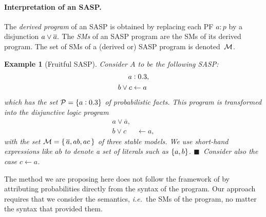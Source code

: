 \documentclass{tlp}
\renewcommand{\cite}{\citep}
\newtheorem{example}{Example}
\newcommand{\cla}[1]{\ensuremath{{\cal #1}}}        %
\newcommand{\clause}{\ensuremath{\leftarrow}}
\newcommand{\co}[1]{\ensuremath{\overline{#1}}}     %
\newcommand{\MODELset}{\ensuremath{\cla{M}}}
\newcommand{\probfact}[2]{\ensuremath{#1:#2}}
\newcommand{\LOOK}{\ensuremath{\blacksquare}}
\newcommand{\franc}[1]{{\color{green!30!black}#1}}
\begin{document}
\paragraph{Interpretation of an SASP.}

The \emph{derived program} of an \ac{SASP} is obtained by replacing
each \acl{PF} \(\probfact{a}{p}\) by a disjunction
   \( a \disj \co{a}. \)
The \textit{\aclp{SM}} of an \acs{SASP} program are the \aclp{SM}
of its derived program.
The set of \acp{SM} of a (derived or) \acs{SASP} program is
denoted~\(\MODELset\).

\begin{example}[Fruitful SASP]
  \label{ex:fruitful}\em Consider \(A\) to be the following \ac{SASP}:
  \begin{equation}\label{eq:fruitful}
    \begin{split}
      \probfact{a&}{0.3}, \\
      b \vee c          & \clause a
    \end{split}
  \end{equation}
  which has the set \({\cal P} = \{ a:0.3 \}\) of probabilistic
  facts.  This program is transformed into the disjunctive logic
  program
  \begin{equation}\label{eq:derived.fruitful}
    \begin{split}
      a \vee \co{a},\\
      b \vee c          & \clause a,
    \end{split}
  \end{equation}
  with the set
       \( {\cal M} = \{\, \co{a}, ab, ac\, \} \)
  of three stable models.
  We use short-hand expressions like \(ab\) to denote a set
  of literals such as \(\set{a, b}\).
  \franc{\LOOK~Consider also the case \(c \clause a\).}
\end{example}

The method we are proposing here does not follow the framework of \cite{kifer1992theory} by attributing probabilities directly from the syntax of the program. Our approach requires that we consider the semantics, \emph{i.e.}\ the \aclp{SM} of the program, no matter the syntax that provided them.
\end{document}
